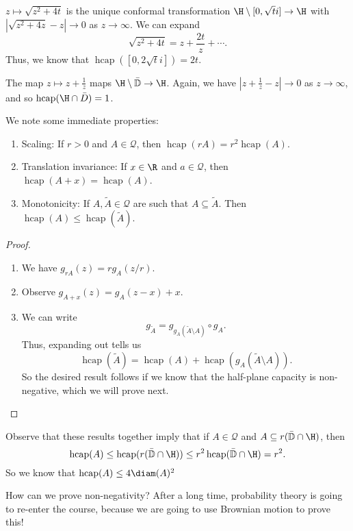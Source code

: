 \documentclass[a4paper]{article}
\renewcommand\D{\mathbb{D}}
\DeclareMathOperator\hcap{hcap}
\begin{document}
\begin{eg}
  $z \mapsto \sqrt{z^2 + 4t}$ is the unique conformal transformation $\H \setminus [0, \sqrt{t}i] \to \H$ with $|\sqrt{z^2 + 4z} - z| \to 0$ as $z \to \infty$. We can expand
  \[
    \sqrt{z^2 + 4t} = z + \frac{2t}{z} + \cdots.
  \]
  Thus, we know that $\hcap([0, 2\sqrt{t} i]) = 2t$.
\end{eg}

\begin{eg}
  The map $z \mapsto z + \frac{1}{z}$ maps $\H \setminus \bar{\D} \to \H$. Again, we have $|z + \frac{1}{z} - z| \to 0$ as $z \to \infty$, and so $\hcap(\H \cap \bar{D}) = 1$.
\end{eg}
We note some immediate properties:
\begin{prop}\leavevmode
  \begin{enumerate}
    \item Scaling: If $r > 0$ and $A \in \mathcal{Q}$, then $\hcap(rA) = r^2 \hcap(A)$.
    \item Translation invariance: If $x \in \R$ and $a \in \mathcal{Q}$, then $\hcap(A + x) = \hcap(A)$.
    \item Monotonicity: If $A, \tilde{A} \in \mathcal{Q}$ are such that $A \subseteq \tilde{A}$. Then $\hcap(A) \leq \hcap(\tilde{A})$.
  \end{enumerate}
\end{prop}

\begin{proof}\leavevmode
  \begin{enumerate}
    \item We have $g_{rA}(z) = r g_A(z/r)$.
    \item Observe $g_{A + x}(z) = g_A(z - x) + x$.
    \item We can write
      \[
        g_{\tilde{A}} = g_{g_A(\tilde{A} \setminus A)} \circ g_A.
      \]
      Thus, expanding out tells us
      \[
        \hcap(\tilde{A}) = \hcap(A) + \hcap(g_A(\tilde{A}\setminus A)).
      \]
      So the desired result follows if we know that the half-plane capacity is non-negative, which we will prove next.\qedhere
  \end{enumerate}
\end{proof}
Observe that these results together imply that if $A \in \mathcal{Q}$ and $A \subseteq r(\bar{\D} \cap \H)$, then
\[
  \hcap(A) \leq \hcap(r(\bar{\D} \cap \H)) \leq r^2 \hcap (\bar{\D} \cap \H) = r^2.
\]
So we know that $\hcap(A) \leq 4 \diam(A)^2$

How can we prove non-negativity? After a long time, probability theory is going to re-enter the course, because we are going to use Brownian motion to prove this!
\end{document}
